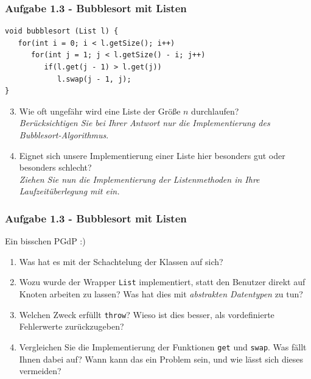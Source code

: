 \documentclass{beamer}
\begin{document}
\begin{frame}[fragile]
	\frametitle{Aufgabe 1.3 - Bubblesort mit Listen}
	\begin{verbatim}
void bubblesort (List l) {
   for(int i = 0; i < l.getSize(); i++)
      for(int j = 1; j < l.getSize() - i; j++)
         if(l.get(j - 1) > l.get(j))
            l.swap(j - 1, j);
}
         \end{verbatim}
	\begin{enumerate}
		\setcounter{enumi}{2}
		\item Wie oft ungefähr wird eine Liste der Größe $n$ durchlaufen? \\
		      \textit{Berücksichtigen Sie bei Ihrer Antwort nur die Implementierung des Bubblesort-Algorithmus}.
		\item Eignet sich unsere Implementierung einer Liste hier besonders gut oder besonders schlecht? \\
		      \textit{Ziehen Sie nun die Implementierung der Listenmethoden in Ihre Laufzeitüberlegung mit ein.}
	\end{enumerate}
\end{frame}

\begin{frame}
	\frametitle{Aufgabe 1.3 - Bubblesort mit Listen}
   Ein bisschen PGdP :) \\

	\begin{enumerate}
		\item Was hat es mit der Schachtelung der Klassen auf sich?
		\item Wozu wurde der Wrapper \texttt{List} implementiert, statt den Benutzer direkt auf Knoten
		      arbeiten zu lassen? Was hat dies mit \textit{abstrakten Datentypen} zu tun?
		\item Welchen Zweck erfüllt \texttt{throw}? Wieso ist dies besser, als vordefinierte Fehlerwerte
		      zurückzugeben?
		\item Vergleichen Sie die Implementierung der Funktionen \texttt{get} und \texttt{swap}.
		      Was fällt Ihnen dabei auf? Wann kann das ein Problem sein, und wie lässt sich dieses vermeiden?
	\end{enumerate}
\end{frame}
\end{document}

